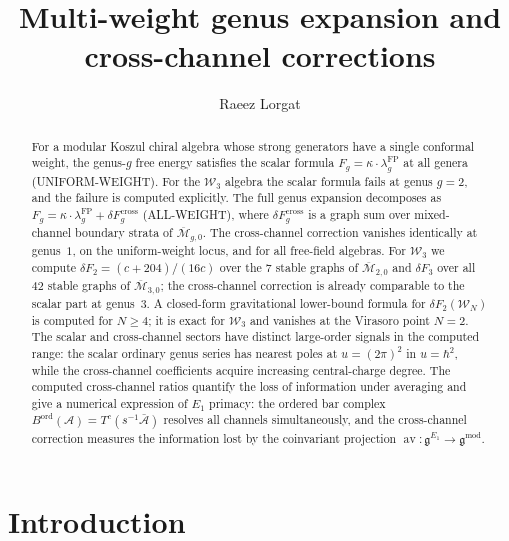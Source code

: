 \documentclass[11pt]{article}
\theoremstyle{definition}
\theoremstyle{remark}
\newcommand{\cA}{\mathcal{A}}
\newcommand{\cM}{\mathcal{M}}
\newcommand{\Walg}{\mathcal{W}}
\newcommand{\fg}{\mathfrak{g}}
\newcommand{\FP}{\mathrm{FP}}
\newcommand{\cross}{\mathrm{cross}}
\DeclareMathOperator{\av}{av}
\DeclareMathOperator{\ord}{ord}
\numberwithin{equation}{section}
\begin{document}
\title{Multi-weight genus expansion and cross-channel corrections}

\author{Raeez Lorgat}
\date{}

\maketitle

\begin{abstract}
For a modular Koszul chiral algebra whose strong generators
have a single conformal weight, the genus-$g$ free energy
satisfies the scalar formula
$F_g = \kappa \cdot \lambda_g^{\FP}$ at all genera
(UNIFORM-WEIGHT).
For the $\Walg_3$ algebra the scalar formula fails at genus
\(g=2\), and the failure is computed explicitly.
The full genus expansion decomposes as
$F_g = \kappa \cdot \lambda_g^{\FP}
+ \delta F_g^{\cross}$ (ALL-WEIGHT),
where $\delta F_g^{\cross}$ is a graph sum over
mixed-channel boundary strata of
$\overline{\cM}_{g,0}$.
The cross-channel correction vanishes identically at
genus~$1$, on the uniform-weight locus, and for all
free-field algebras.
For $\Walg_3$ we compute
$\delta F_2 = (c{+}204)/(16c)$ over the $7$ stable graphs of
$\overline{\cM}_{2,0}$ and
$\delta F_3$ over all $42$ stable graphs of
$\overline{\cM}_{3,0}$; the cross-channel correction is
already comparable to the scalar part at genus~$3$.
A closed-form gravitational lower-bound formula for
\(\delta F_2(\Walg_N)\) is computed for \(N\geq4\); it is exact for
\(\Walg_3\) and vanishes at the Virasoro point \(N=2\).
The scalar and cross-channel sectors have distinct large-order
signals in the computed range: the scalar ordinary genus series
has nearest poles at \(u=(2\pi)^2\) in \(u=\hbar^2\), while the
cross-channel coefficients acquire increasing central-charge degree.
The computed cross-channel ratios quantify the loss of information
under averaging and give a numerical expression
of $E_1$ primacy: the ordered bar complex
$B^{\ord}(\cA) = T^c(s^{-1}\bar{\cA})$ resolves all
channels simultaneously, and the cross-channel correction
measures the information lost by the coinvariant projection
$\av \colon \fg^{E_1} \to \fg^{\mathrm{mod}}$.
\end{abstract}

\tableofcontents


\section{Introduction}\label{sec:introduction}
\end{document}

